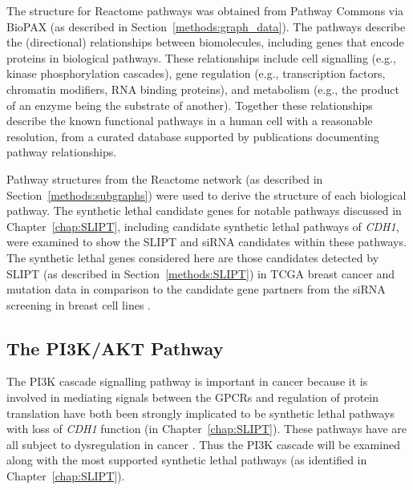 The  structure for Reactome \glspl{pathway} was obtained from Pathway Commons via \gls{BioPAX} (as described in Section~\ref{methods:graph_data}). The \glspl{pathway} describe the (directional) relationships between biomolecules, including genes that encode proteins in biological \glspl{pathway}. These relationships include cell signalling (e.g., kinase phosphorylation cascades), gene regulation (e.g., transcription factors, chromatin modifiers, \acrshort{RNA} binding proteins), and metabolism (e.g., the product of an enzyme being the substrate of another). Together these relationships describe the known functional \glspl{pathway} in a human cell with a reasonable resolution, from a curated database supported by publications documenting \gls{pathway} relationships. 

Pathway structures from the Reactome network (as described in Section~\ref{methods:subgraphs}) were used to derive the  structure of each biological \gls{pathway}. The \gls{synthetic lethal} candidate genes for notable \glspl{pathway} discussed in Chapter~\ref{chap:SLIPT}, including candidate \gls{synthetic lethal} \glspl{pathway} of \textit{CDH1}, were examined to show the \gls{SLIPT} and \gls{siRNA} candidates within these \glspl{pathway}. The \gls{synthetic lethal} genes considered here are those candidates detected by \gls{SLIPT} (as described in Section~\ref{methods:SLIPT}) in \gls{TCGA} breast cancer  and \gls{mutation} data \citep{TCGA2012} in comparison to the candidate gene partners from the \gls{siRNA} screening in breast cell lines \citep{Telford2015}. 

\FloatBarrier

\subsection{The PI3K/AKT Pathway}  \label{chapt4:SL_Genes_PI3K}

\FloatBarrier

The \acrfull{PI3K} cascade signalling \gls{pathway} is important in cancer because it is involved in mediating signals between the \glspl{GPCR} and regulation of protein translation have both been strongly implicated to be \gls{synthetic lethal} \glspl{pathway} with loss of \textit{CDH1} function (in Chapter~\ref{chap:SLIPT}). These \glspl{pathway} have are all subject to dysregulation in cancer \citep{Dorsam2007, Courtney2010, Gao2015}. Thus the PI3K cascade will be examined along with the most supported \gls{synthetic lethal} \glspl{pathway} (as identified in Chapter~\ref{chap:SLIPT}). %


